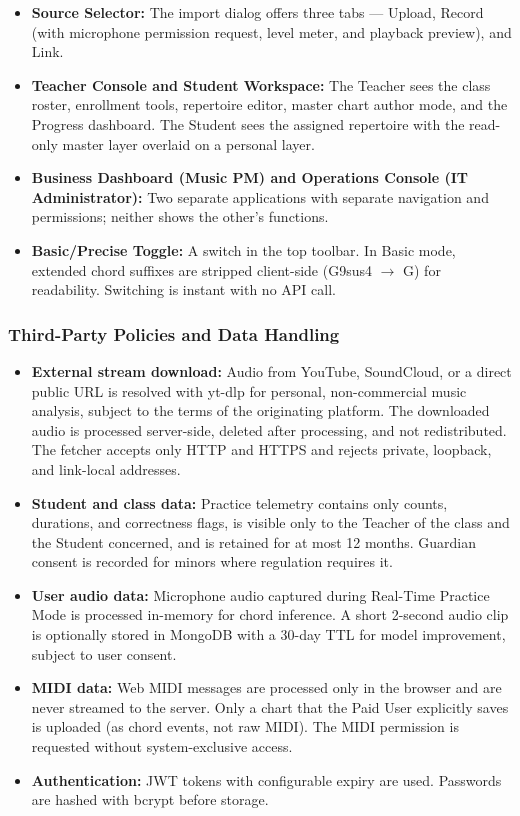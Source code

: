 \documentclass[a4paper]{article}
\begin{document}
\begin{itemize}
    \item \textbf{Source Selector:} The import dialog offers three tabs --- Upload, Record (with microphone permission request, level meter, and playback preview), and Link.
    \item \textbf{Teacher Console and Student Workspace:} The Teacher sees the class roster, enrollment tools, repertoire editor, master chart author mode, and the Progress dashboard. The Student sees the assigned repertoire with the read-only master layer overlaid on a personal layer.
    \item \textbf{Business Dashboard (Music PM) and Operations Console (IT Administrator):} Two separate applications with separate navigation and permissions; neither shows the other's functions.
    \item \textbf{Basic/Precise Toggle:} A switch in the top toolbar. In Basic mode, extended chord suffixes are stripped client-side (G9sus4 $\to$ G) for readability. Switching is instant with no API call.
\end{itemize}

\subsubsection{Third-Party Policies and Data Handling}

\begin{itemize}
    \item \textbf{External stream download:} Audio from YouTube, SoundCloud, or a direct public URL is resolved with yt-dlp for personal, non-commercial music analysis, subject to the terms of the originating platform. The downloaded audio is processed server-side, deleted after processing, and not redistributed. The fetcher accepts only HTTP and HTTPS and rejects private, loopback, and link-local addresses.
    \item \textbf{Student and class data:} Practice telemetry contains only counts, durations, and correctness flags, is visible only to the Teacher of the class and the Student concerned, and is retained for at most 12 months. Guardian consent is recorded for minors where regulation requires it.
    \item \textbf{User audio data:} Microphone audio captured during Real-Time Practice Mode is processed in-memory for chord inference. A short 2-second audio clip is optionally stored in MongoDB with a 30-day TTL for model improvement, subject to user consent.
    \item \textbf{MIDI data:} Web MIDI messages are processed only in the browser and are never streamed to the server. Only a chart that the Paid User explicitly saves is uploaded (as chord events, not raw MIDI). The MIDI permission is requested without system-exclusive access.
    \item \textbf{Authentication:} JWT tokens with configurable expiry are used. Passwords are hashed with bcrypt before storage.
\end{itemize}
\end{document}
